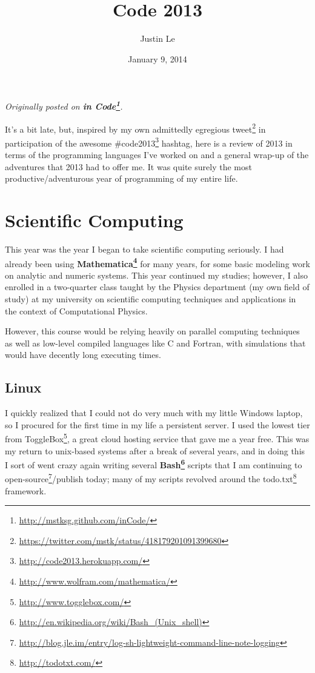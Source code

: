 \documentclass[]{article}
\title{Code 2013}
\author{Justin Le}
\date{January 9, 2014}
\renewcommand{\href}[2]{#2\footnote{\url{#1}}}
\begin{document}
\maketitle

\emph{Originally posted on
\textbf{\href{http://mstksg.github.com/inCode/}{in Code}}.}

It's a bit late, but, inspired by my own admittedly egregious
\href{https://twitter.com/mstk/status/418179201091399680}{tweet} in
participation of the awesome
\href{http://code2013.herokuapp.com/}{\#code2013} hashtag, here is a
review of 2013 in terms of the programming languages I've worked on and
a general wrap-up of the adventures that 2013 had to offer me. It was
quite surely the most productive/adventurous year of programming of my
entire life.

\section{Scientific Computing}\label{scientific-computing}

This year was the year I began to take scientific computing seriously. I
had already been using
\textbf{\href{http://www.wolfram.com/mathematica/}{Mathematica}} for
many years, for some basic modeling work on analytic and numeric
systems. This year continued my studies; however, I also enrolled in a
two-quarter class taught by the Physics department (my own field of
study) at my university on scientific computing techniques and
applications in the context of Computational Physics.

However, this course would be relying heavily on parallel computing
techniques as well as low-level compiled languages like C and Fortran,
with simulations that would have decently long executing times.

\subsection{Linux}\label{linux}

I quickly realized that I could not do very much with my little Windows
laptop, so I procured for the first time in my life a persistent server.
I used the lowest tier from \href{http://www.togglebox.com/}{ToggleBox},
a great cloud hosting service that gave me a year free. This was my
return to unix-based systems after a break of several years, and in
doing this I sort of went crazy again writing several
\textbf{\href{http://en.wikipedia.org/wiki/Bash_(Unix_shell)}{Bash}}
scripts that I am continuing to
\href{http://blog.jle.im/entry/log-sh-lightweight-command-line-note-logging}{open-source}/publish
today; many of my scripts revolved around the
\href{http://todotxt.com/}{todo.txt} framework.
\end{document}
